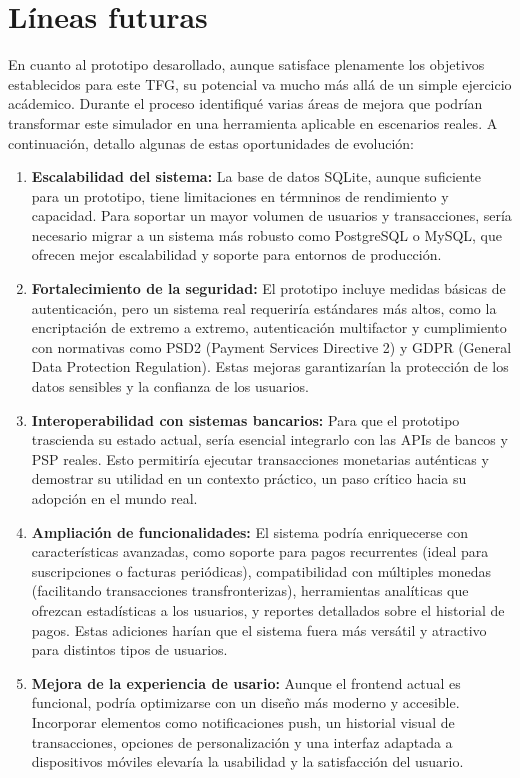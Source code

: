 \newpage
\null
\clearpage
\chapter{Líneas futuras}
\label{sec:Potencial}
En cuanto al prototipo desarollado, aunque satisface plenamente los objetivos establecidos para este TFG, su potencial va mucho más allá de un simple ejercicio acádemico. Durante el proceso identifiqué varias áreas de mejora que podrían transformar este simulador en una herramienta aplicable en escenarios reales. A continuación, detallo algunas de estas oportunidades de evolución:

\begin{enumerate}
    \item \textbf{Escalabilidad del sistema:} La base de datos SQLite, aunque suficiente para un prototipo, tiene limitaciones en térmninos de rendimiento y capacidad. Para soportar un mayor volumen de usuarios y transacciones, sería necesario migrar a un sistema más robusto como PostgreSQL o MySQL, que ofrecen mejor escalabilidad y soporte para entornos de producción.
    \item \textbf{Fortalecimiento de la seguridad:} El prototipo incluye medidas básicas de autenticación, pero un sistema real requeriría estándares más altos, como la encriptación de extremo a extremo, autenticación multifactor y cumplimiento con normativas como PSD2 (Payment Services Directive 2) y GDPR (General Data Protection Regulation). Estas mejoras garantizarían la protección de los datos sensibles y la confianza de los usuarios.
    \item \textbf{Interoperabilidad con sistemas bancarios:} Para que el prototipo trascienda su estado actual, sería esencial integrarlo con las APIs de bancos y PSP reales. Esto permitiría ejecutar transacciones monetarias auténticas y demostrar su utilidad en un contexto práctico, un paso crítico hacia su adopción en el mundo real.
    \item \textbf{Ampliación de funcionalidades:} El sistema podría enriquecerse con características avanzadas, como soporte para pagos recurrentes (ideal para suscripciones o facturas periódicas), compatibilidad con múltiples monedas (facilitando transacciones transfronterizas), herramientas analíticas que ofrezcan estadísticas a los usuarios, y reportes detallados sobre el historial de pagos. Estas adiciones harían que el sistema fuera más versátil y atractivo para distintos tipos de usuarios.
    \item \textbf{Mejora de la experiencia de usario:} Aunque el frontend actual es funcional, podría optimizarse con un diseño más moderno y accesible. Incorporar elementos como notificaciones push, un historial visual de transacciones, opciones de personalización y una interfaz adaptada a dispositivos móviles elevaría la usabilidad y la satisfacción del usuario.
\end{enumerate}

